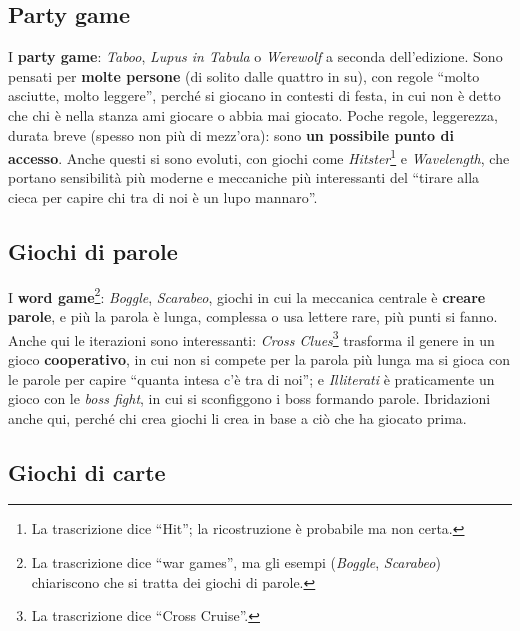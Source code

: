 \subsection{Party game}

I \textbf{party game}: \emph{Taboo}, \emph{Lupus in Tabula} o \emph{Werewolf} a
seconda dell'edizione. Sono pensati per \textbf{molte persone} (di solito dalle
quattro in su), con regole ``molto asciutte, molto leggere'', perché si giocano
in contesti di festa, in cui non è detto che chi è nella stanza ami giocare o
abbia mai giocato. Poche regole, leggerezza, durata breve (spesso non più di
mezz'ora): sono \textbf{un possibile punto di accesso}. Anche questi si sono
evoluti, con giochi come \emph{Hitster}\footnote{La trascrizione dice ``Hit'';
la ricostruzione è probabile ma non certa.} e \emph{Wavelength}, che portano
sensibilità più moderne e meccaniche più interessanti del ``tirare alla cieca
per capire chi tra di noi è un lupo mannaro''.

\subsection{Giochi di parole}

I \textbf{word game}\footnote{La trascrizione dice ``war games'', ma gli esempi
(\emph{Boggle}, \emph{Scarabeo}) chiariscono che si tratta dei giochi di
parole.}: \emph{Boggle}, \emph{Scarabeo}, giochi in cui la meccanica centrale è
\textbf{creare parole}, e più la parola è lunga, complessa o usa lettere rare,
più punti si fanno. Anche qui le iterazioni sono interessanti: \emph{Cross
Clues}\footnote{La trascrizione dice ``Cross Cruise''.} trasforma il genere in
un gioco \textbf{cooperativo}, in cui non si compete per la parola più lunga ma si
gioca con le parole per capire ``quanta intesa c'è tra di noi''; e
\emph{Illiterati} è praticamente un gioco con le \emph{boss fight}, in cui si
sconfiggono i boss formando parole. Ibridazioni anche qui, perché chi crea giochi
li crea in base a ciò che ha giocato prima.

\subsection{Giochi di carte}



